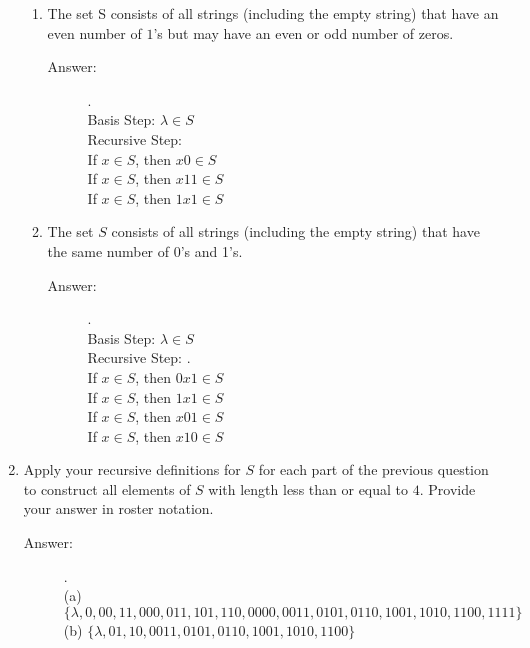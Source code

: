 \documentclass[12pt, oneside]{article}
\begin{document}
\begin{enumerate}
            
            \begin{enumerate}
                \item The set S consists of all strings (including the empty string) that have an even number of $1$'s but may have an even or odd number of zeros.
                \begin{description}
                    \item[Answer:] .\\
                    Basis Step: $\lambda \in S$ \\
                    Recursive Step: \\
                    If $x \in S$, then $x0 \in S$ \\
                    If $x \in S$, then $x11 \in S$ \\
                    If $x \in S$, then $1x1 \in S$ \\
                \end{description}
                \item The set $S$ consists of all strings (including the empty string) that have the same number of 0's and 1's.
                \begin{description}
                    \item[Answer:] .\\
                    Basis Step: $\lambda \in S$ \\
                    Recursive Step: .\\
                    If $x \in S$, then $0x1 \in S$ \\
                    If $x \in S$, then $1x1 \in S$ \\
                    If $x \in S$, then $x01 \in S$ \\
                    If $x \in S$, then $x10 \in S$ \\
                \end{description}
            \end{enumerate}
            
            \item Apply your recursive definitions for $S$ for each part of the previous question to construct all elements of $S$ with length less than or equal to $4$. Provide your answer in roster notation.
            
            \begin{description}
                \item[Answer:] .\\
                (a) $\{ \lambda, 0, 00, 11, 000, 011, 101, 110, 0000, 0011, 0101, 0110, 1001, 1010, 1100, 1111 \}$ \\
                (b) $\{ \lambda, 01, 10, 0011, 0101, 0110, 1001, 1010, 1100 \}$
            \end{description}


\end{enumerate}
\end{document}
